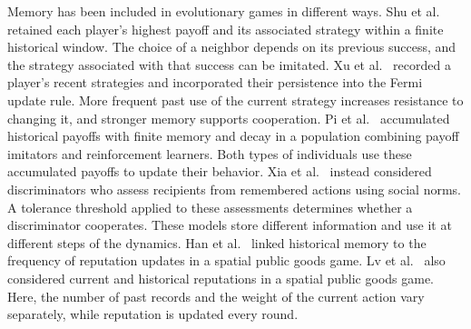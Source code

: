\documentclass[physics,article,submit,moreauthors]{Definitions/mdpi}
\begin{document}
Memory has been included in evolutionary games in different ways. Shu et al.~\cite{shu2019} retained each player's highest payoff and its associated strategy within a finite historical window. The choice of a neighbor depends on its previous success, and the strategy associated with that success can be imitated. Xu et al.~\cite{xu2024} recorded a player's recent strategies and incorporated their persistence into the Fermi update rule. More frequent past use of the current strategy increases resistance to changing it, and stronger memory supports cooperation. Pi et al.~\cite{pi2024} accumulated historical payoffs with finite memory and decay in a population combining payoff imitators and reinforcement learners. Both types of individuals use these accumulated payoffs to update their behavior. Xia et al.~\cite{xia2020} instead considered discriminators who assess recipients from remembered actions using social norms. A tolerance threshold applied to these assessments determines whether a discriminator cooperates. These models store different information and use it at different steps of the dynamics. Han et al.~\cite{han2021} linked historical memory to the frequency of reputation updates in a spatial public goods game. Lv et al.~\cite{lv2023} also considered current and historical reputations in a spatial public goods game. Here, the number of past records and the weight of the current action vary separately, while reputation is updated every round.
\end{document}
